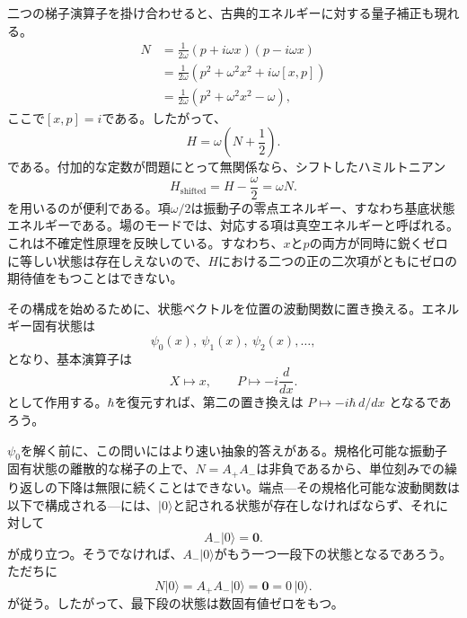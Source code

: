 二つの梯子演算子を掛け合わせると、古典的エネルギーに対する量子補正も現れる。
\begin{align}
N
&=\frac{1}{2\omega}(p+i\omega x)(p-i\omega x)\\
&=\frac{1}{2\omega}\left(p^{2}+\omega^{2}x^{2}
 +i\omega[x,p]\right)\\
&=\frac{1}{2\omega}\left(p^{2}+\omega^{2}x^{2}-\omega\right),
\end{align}
ここで\([x,p]=i\)である。したがって、
\begin{equation}
H=\omega\left(N+\frac12\right).
\end{equation}
である。付加的な定数が問題にとって無関係なら、シフトしたハミルトニアン
\begin{equation}
H_{\mathrm{shifted}}=H-\frac{\omega}{2}=\omega N.
\end{equation}
を用いるのが便利である。項\(\omega/2\)は振動子の零点エネルギー、すなわち基底状態エネルギーである。場のモードでは、対応する項は真空エネルギーと呼ばれる。これは不確定性原理を反映している。すなわち、\(x\)と\(p\)の両方が同時に鋭くゼロに等しい状態は存在しえないので、\(H\)における二つの正の二次項がともにゼロの期待値をもつことはできない。

\begin{classroomqa}
\end{classroomqa}

その構成を始めるために、状態ベクトルを位置の波動関数に置き換える。エネルギー固有状態は
\[
\psi_{0}(x),\ \psi_{1}(x),\ \psi_{2}(x),\ldots,
\]
となり、基本演算子は
\begin{equation}
X\longmapsto x,\qquad
P\longmapsto -i\frac{d}{dx}.
\end{equation}
として作用する。\(\hbar\)を復元すれば、第二の置き換えは
\(P\mapsto-i\hbar\,d/dx\)
となるであろう。

\(\psi_{0}\)を解く前に、この問いにはより速い抽象的答えがある。規格化可能な振動子固有状態の離散的な梯子の上で、\(N=A_{+}A_{-}\)は非負であるから、単位刻みでの繰り返しの下降は無限に続くことはできない。端点---その規格化可能な波動関数は以下で構成される---には、\(\lvert0\rangle\)と記される状態が存在しなければならず、それに対して
\begin{equation}
A_{-}\lvert0\rangle=\mathbf 0.
\end{equation}
が成り立つ。そうでなければ、\(A_{-}\lvert0\rangle\)がもう一つ一段下の状態となるであろう。ただちに
\begin{equation}
N\lvert0\rangle
=A_{+}A_{-}\lvert0\rangle
=\mathbf 0
=0\,\lvert0\rangle.
\end{equation}
が従う。したがって、最下段の状態は数固有値ゼロをもつ。

